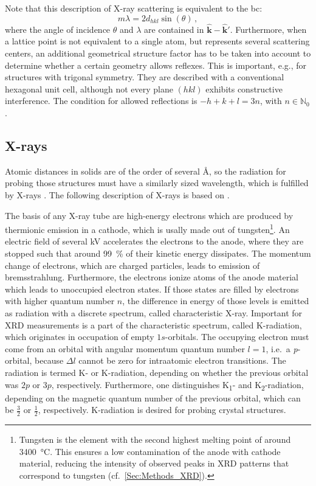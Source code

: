 Note that this description of X-ray scattering is equivalent to the \gls{bc}:
\begin{equation}\label{Equ:Theory_BraggCondition}
    m\lambda=2d_{hkl}\sin(\theta)\,,
\end{equation}
where the angle of incidence $\theta$ and $\lambda$ are contained in $\hat{\mathbf{k}}-\hat{\mathbf{k}}'$.
Furthermore, when a lattice point is not equivalent to a single atom, but represents several scattering centers, an additional geometrical structure factor has to be taken into account to determine whether a certain geometry allows reflexes.
This is important, e.g., for structures with trigonal symmetry. 
They are described with a conventional hexagonal unit cell, although not every plane $(hkl)$ exhibits constructive interference.
The condition for allowed reflections is $-h+k+l=3n$, with $n\in\mathbb{N}_0$ \cite{grundmann2021}.

\subsection{X-rays}\label{Sec:Theory_XRays}
Atomic distances in solids are of the order of several \si{\angstrom}, so the radiation for probing those structures must have a similarly sized wavelength, which is fulfilled by X-rays
    \cite{harrington2021}.
The following description of X-rays is based on \textcite{spiess2009}.

The basis of any X-ray tube are high-energy electrons which are produced by thermionic emission in a cathode, which is usally made out of tungsten\footnote{
    Tungsten is the element with the second highest melting point of around \qty{3400}{\celsius}.
    This ensures a low contamination of the anode with cathode material, reducing the intensity of observed peaks in \gls{XRD} patterns that correspond to tungsten (cf.\ \ref{Sec:Methods_XRD}). 
}.
An electric field of several \si{\kV} accelerates the electrons to the anode, where they are stopped such that around \qty{99}{\percent} of their kinetic energy dissipates.
The momentum change of electrons, which are charged particles, leads to emission of bremsstrahlung.
Furthermore, the electrons ionize atoms of the anode material which leads to unoccupied electron states.
If those states are filled by electrons with higher quantum number $n$, the difference in energy of those levels is emitted as radiation with a discrete spectrum, called characteristic X-ray.
Important for \gls{XRD} measurements is a part of the characteristic spectrum, called K-radiation, which originates in occupation of empty $1s$-orbitals.
The occupying electron must come from an orbital with angular momentum quantum number $l=1$, i.e.\ a \textit{p}-orbital, because $\Delta l$ cannot be zero for intraatomic electron transitions.
The radiation is termed K\textalpha- or K\textbeta-radiation, depending on whether the previous orbital was $2p$ or $3p$, respectively.
Furthermore, one distinguishes K\textalpha\textsubscript{1}- and K\textalpha\textsubscript{2}-radiation, depending on the magnetic quantum number of the previous orbital, which can be $\frac{3}{2}$ or $\frac{1}{2}$, respectively.
K\textalpha-radiation is desired for probing crystal structures.